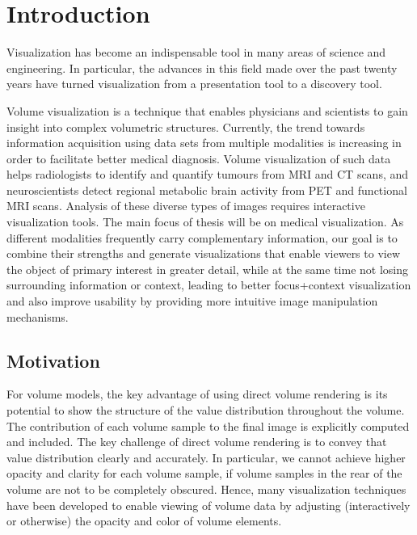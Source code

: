 
\chapter{Introduction}\label{chap:intro}

Visualization has become an indispensable tool in many areas of science and engineering. In particular, the advances in this field made over the past twenty years have turned visualization from a presentation tool to a discovery tool.

Volume visualization is a technique that enables physicians and scientists to gain insight into complex volumetric structures. Currently, the trend towards information acquisition using data sets from multiple modalities is increasing in order to facilitate better medical diagnosis.  Volume visualization of such data helps radiologists to identify and quantify tumours from MRI and CT scans, and neuroscientists detect regional metabolic brain activity from PET and functional MRI scans. Analysis of these diverse types of images requires interactive visualization tools. The main focus of thesis will be on medical visualization. As different modalities frequently carry complementary information, our goal is to combine their strengths and generate visualizations that enable viewers to view the object of primary interest in  greater detail, while at the same time not losing surrounding information or context, leading to better focus+context visualization and also improve usability by providing more intuitive image manipulation mechanisms. \\


\section{Motivation}

For volume models, the key advantage of using direct volume rendering is its potential to show the structure of the value distribution throughout the volume. The contribution of each volume sample to the final image is explicitly computed and included. The key challenge of direct volume rendering is to convey that value distribution clearly and accurately. In particular, we cannot achieve higher opacity and clarity for each volume sample, if volume samples in the rear of the volume are not to be completely obscured. Hence, many visualization techniques have been developed to enable viewing of volume data by adjusting (interactively or otherwise) the opacity and color of volume elements.

